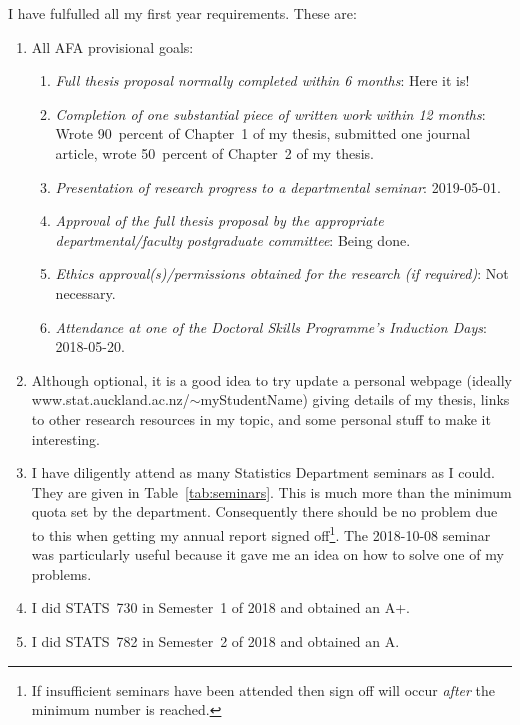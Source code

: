 \documentclass[12pt,a4paper]{article}
\begin{document}
I have fulfulled all my first year requirements.
These are:
\begin{enumerate}

\item
All AFA provisional goals:
\begin{enumerate}

\item
\textit{Full thesis proposal normally completed within 6 months}:
Here it is!

\item
\textit{Completion of one substantial piece of written work within
12 months}: Wrote 90~percent of Chapter~1 of my thesis, submitted
one journal article, wrote 50~percent of Chapter~2 of my thesis.


\item
\textit{Presentation of research progress to a departmental seminar}:
2019-05-01.

\item
\textit{Approval of the full thesis proposal by the appropriate
departmental/faculty postgraduate committee}:
Being done.

\item
\textit{Ethics approval(s)/permissions obtained for the research
(if required)}:
Not necessary.

\item
\textit{Attendance at one of the Doctoral Skills Programme's
Induction Days}:
2018-05-20.

\end{enumerate}



\item
Although optional,
it is a good idea to try update a personal webpage
(ideally \textsf{www.stat.auckland.ac.nz/$\sim$myStudentName})
giving details of my thesis, links to other research resources
in my topic, and some personal stuff to make it interesting.



\item
I have diligently attend as many Statistics Department seminars
as I could. They are given in Table~\ref{tab:seminars}.
This is much more than the minimum quota set by the department.
Consequently there should be no problem due to this when getting
my annual report signed off\footnote{If insufficient seminars have
been attended then sign off will occur \textit{after} the minimum number
is reached.}.
The 2018-10-08 seminar was particularly useful because it gave
me an idea on how to solve one of my problems.



\item
I did STATS~730 in Semester~1 of 2018 and obtained an A+.



\item
I did STATS~782 in Semester~2 of 2018 and obtained an A.



\end{enumerate}
\end{document}
